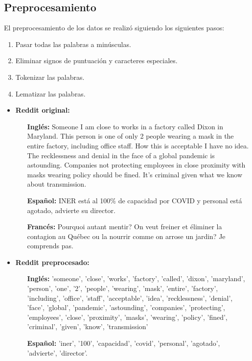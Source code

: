 \subsection{Preprocesamiento}

El preprocesamiento de los datos se realizó siguiendo los siguientes pasos:
\begin{enumerate}
    \item Pasar todas las palabras a minúsculas.
    \item Eliminar signos de puntuación y caracteres especiales.
    \item Tokenizar las palabras.
    \item Lematizar las palabras.
\end{enumerate}

\begin{itemize}
    \item \textbf{Reddit original:}
    \begin{itemize}
        \item [\textbf{Inglés:}] Someone I am close to works in a factory called Dixon in Maryland. This person is one of only 2 people wearing a mask in the entire factory, including office staff. How this is acceptable I have no idea. The recklessness and denial in the face of a global pandemic is astounding. Companies not protecting employees in close proximity with masks wearing policy should be fined. It's criminal given what we know about transmission.
        \item [\textbf{Español:}] INER está al 100\% de capacidad por COVID y personal está agotado, advierte su director.
        \item [\textbf{Francés:}] Pourquoi autant mentir? On veut freiner et éliminer la contagion au Québec ou la nourrir comme on arrose un jardin? Je comprends pas.
    \end{itemize}
    \item \textbf{Reddit preprocesado:}
    \begin{itemize}
        \item [\textbf{Inglés:}] 'someone', 'close', 'works', 'factory', 'called', 'dixon', 'maryland', 'person', 'one', '2', 'people', 'wearing', 'mask', 'entire', 'factory', 'including', 'office', 'staff', 'acceptable', 'idea', 'recklessness', 'denial', 'face', 'global', 'pandemic', 'astounding', 'companies', 'protecting', 'employees', 'close', 'proximity', 'masks', 'wearing', 'policy', 'fined', 'criminal', 'given', 'know', 'transmission'
        \item [\textbf{Español:}]'iner', '100', 'capacidad', 'covid', 'personal', 'agotado', 'advierte', 'director'.

\end{itemize}
\end{itemize}
